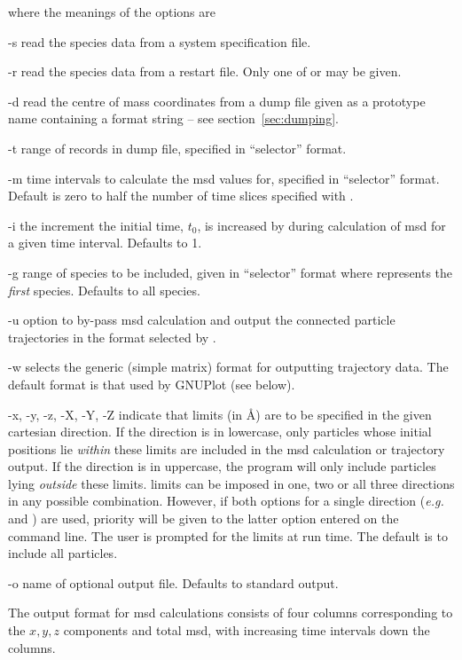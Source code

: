 \documentclass[a4paper,twoside]{report}
\newcommand{\eg}{\emph{e.g.}}
\begin{document}
where the meanings of the options are
\begin{Argdescription}
\item[-s] read the species data from a system specification file.
\item[-r] read the species data from a restart file. Only one of
   or  may be given.
\item[-d] read the centre of mass coordinates from a dump file given as a
prototype name containing a  format string -- see
section~\ref{sec:dumping}. 
\item[-t] range of records in dump file, specified in ``selector'' format.
\item[-m] time intervals to calculate the msd values for, specified in
  ``selector'' format. Default is zero to half the number of time slices specified with .
\item[-i] the increment the initial time, $t_0$, is increased by during
calculation of msd for a given time interval. Defaults to 1.
\item[-g] range of species to be included, given in ``selector''
  format where  represents the \emph{first} species. Defaults
  to all species. 
\item[-u] option to by-pass msd calculation and output the connected particle
trajectories in the format selected by . 
\item[-w] selects the generic (simple matrix) format for outputting trajectory data. 
The default format is that used by GNUPlot (see below). 
\item[-x, -y, -z, -X, -Y, -Z] indicate that limits (in {\AA}) are to be
  specified in the given cartesian direction. If the direction is in
  lowercase, only particles whose initial positions lie \emph{within}
  these limits are included in the msd calculation or trajectory
  output. If the direction is in uppercase, the program will only
  include particles lying \emph{outside} these limits. limits can be
  imposed in one, two or all three directions in any possible
  combination. However, if both options for a single direction (\eg\ 
   and ) are used, priority will be given to the
  latter option entered on the command line. The user is prompted for
  the limits at run time. The default is to include all particles.
\item[-o] name of optional output file. Defaults to standard output.
\end{Argdescription}


The output format for msd calculations consists of four columns
corresponding to the $x, y, z$ components and total msd, with
increasing time intervals down the columns.
\end{document}
